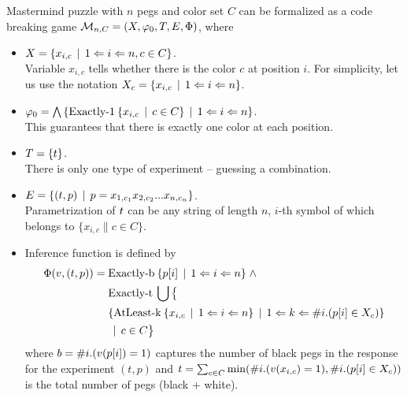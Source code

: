 \begin{example}[Mastermind]
Mastermind puzzle with $n$ pegs and color set $C$ can be formalized as
a code breaking game
$\mathcal{M}_{n,C} = (X, \varphi_0, T, E, \Phi)$, where

\begin{itemize}
\item
$X = \{x_{i,c} \:\:|\:\: 1<=i<=n, c\in C\}$. \\
Variable $x_{i,c}$ tells whether there is the color $c$ at position $i$.
For simplicity, let us use the notation $X_c = \{ x_{i,c} \:\:|\:\: 1<=i<=n \}$.

\item
$\varphi_0 = \bigwedge\left\{
  \textrm{Exactly-1}\: \{x_{i,c} \:\:|\:\: c\in C\} \:\:|\:\: 1<=i<=n\right\}$. \\
This guarantees that there is exactly one color at each position.

\item $T = \{t\}$.\\
There is only one type of experiment -- guessing a combination.

\item $E = \{(t, p) \:\:|\:\: p = x_{1,c_1}x_{2,c_2}...x_{n,c_n}\}$.\\
Parametrization of $t$ can be any string of length $n$,
$i$-th symbol of which belongs to $\{ x_{i,c} \| c \in C\}$.

\item Inference function is defined by
\begin{align*}
\Phi(v, (t, p)) =\;
 & \textrm{Exactly-b}\:\{ p[i] \:\:|\:\: 1<=i<=n \} \;\wedge \\
 & \textrm{Exactly-t}\:\bigcup
      \big\{ \\
          & \{
                \textrm{AtLeast-k}\:\{ x_{i,c} \:\:|\:\: 1<=i<=n \}
                \:\:|\:\: 1 <= k <= \#i.(p[i]\in X_c)
            \} \\
            & \:\:|\:\: c\in C
      \big\}
\end{align*}
where $b = \# i . (v(p[i]) = 1)$ captures the number of black pegs
  in the response for the experiment $(t, p)$ and
  $t = \sum_{c\in C} \min( \#i.(v(x_{i,c}) = 1), \#i.(p[i]\in X_c))$
  is the total number of pegs (black + white).

\end{itemize}
\end{example}

